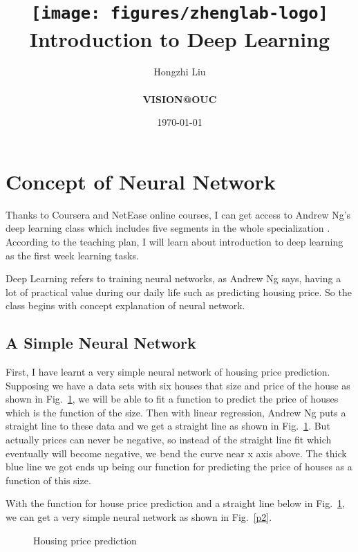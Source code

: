 \documentclass[a4paper]{article}
\title{
    \vspace*{1in}
    \texttt{[image: figures/zhenglab-logo]} \\
    \vspace*{1.2in}
    \textbf{\huge Introduction to Deep Learning}
    \vspace{0.2in}
}
\author{Hongzhi Liu \\
    \vspace*{0.5in} \\
    \textbf{VISION@OUC} \\
    \vspace*{1in}
}
\date{\today}
\begin{document}
\par
\maketitle
\setcounter{page}{0}
\thispagestyle{empty}
\newpage


\section{Concept of Neural Network}

Thanks to Coursera and NetEase online courses, I can get access to Andrew Ng's deep learning class which includes five segments in the whole specialization \cite{course1,course2}. According to the teaching plan, I will learn about introduction to deep learning as the first week learning tasks.

Deep Learning refers to training neural networks, as Andrew Ng says, having a lot of practical value during our daily life such as predicting housing price. So the class begins with concept explanation of neural network. 

\subsection{A Simple Neural Network}
First, I have learnt a very simple neural network of housing price prediction. Supposing we have a data sets with six houses that size and price of the house as shown in Fig.~\ref{p1}, we will be able to fit a function to predict the price of houses which is the function of the size. Then with linear regression, Andrew Ng puts a straight line to these data and we get a straight line as shown in Fig.~\ref{p1}. But actually prices can never be negative, so instead of the straight line fit which eventually will become negative, we bend the curve near x axis above. The thick blue line we got ends up being our function for predicting the price of houses as a function of this size.

With the function for house price prediction and a straight line below in Fig.~\ref{p1}, we can get a very simple neural network as shown in Fig.~\ref{p2}.
\begin{figure}[b] 
	\centering 
	\caption{Housing price prediction} 
	\label{p1} %
\end{figure}
\end{document}
